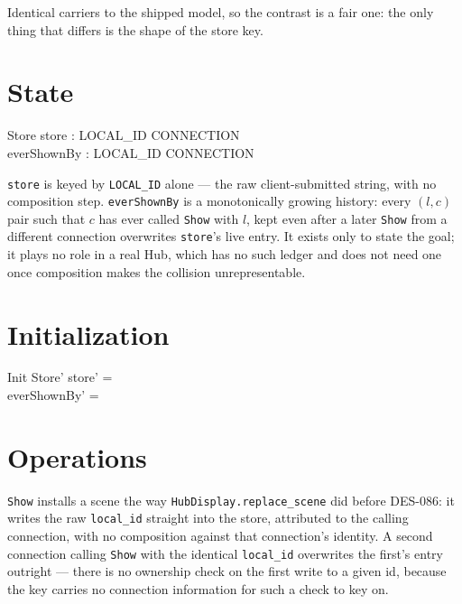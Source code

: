 \documentclass[a4paper,10pt,fleqn]{article}
\begin{document}
Identical carriers to the shipped model, so the contrast is a fair one: the
only thing that differs is the shape of the store key.

\section{State}

\begin{schema}{Store}
  store : LOCAL\_ID \pfun CONNECTION \\
  everShownBy : LOCAL\_ID \rel CONNECTION
\end{schema}

\texttt{store} is keyed by \texttt{LOCAL\_ID} alone --- the raw
client-submitted string, with no composition step. \texttt{everShownBy} is a
monotonically growing history: every $(l, c)$ pair such that $c$ has ever
called \texttt{Show} with $l$, kept even after a later \texttt{Show} from a
different connection overwrites \texttt{store}'s live entry. It exists only
to state the goal; it plays no role in a real Hub, which has no such ledger
and does not need one once composition makes the collision unrepresentable.

\section{Initialization}

\begin{schema}{Init}
  Store'
\where
  store' = \emptyset \\
  everShownBy' = \emptyset
\end{schema}

\section{Operations}

\texttt{Show} installs a scene the way \texttt{HubDisplay.replace\_scene} did
before DES-086: it writes the raw \texttt{local\_id} straight into the store,
attributed to the calling connection, with no composition against that
connection's identity. A second connection calling \texttt{Show} with the
identical \texttt{local\_id} overwrites the first's entry outright ---
there is no ownership check on the first write to a given id, because the key
carries no connection information for such a check to key on.
\end{document}
